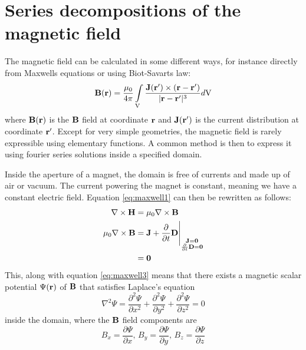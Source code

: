 \section{Series decompositions of the magnetic field}
\label{sec:series_decompositions}
The magnetic field can be calculated in some different ways, for instance
directly from Maxwells equations or using Biot-Savarts law:
\begin{equation}
    \vb{B}(\vb{r}) = \frac{\mu_0}{4\pi}\int\limits_{\mathrm{V}}
    \frac{\vb{J}(\vb{r'})\times (\vb{r} - \vb{r'})}
    {|\vb{r} - \vb{r'}|^3} d\mathrm{V}
    \label{eq:Biot_Savart}
\end{equation}
where $\vb{B}(\vb{r})$ is the $\vb{B}$ field at coordinate $\vb{r}$ and
$\vb{J}(\vb{r'})$ is the current distribution at coordinate $\vb{r'}$.
\cite[Ch.5.4]{russenschuck_field_2011}
Except for very simple geometries, the magnetic field is rarely
expressible using elementary functions. A common method is then
to express it using fourier series solutions inside a specified domain.
\cite[Ch.6]{russenschuck_field_2011}

Inside the aperture of a magnet, the domain is free of currents and made
up of air or vacuum. The current powering the magnet is constant,
meaning we have a constant electric field. Equation \ref{eq:maxwell1}
can then be rewritten as follows:
\begin{align}
    \begin{split}
        \nabla \times \vb{H} &= \mu_0\nabla \times \vb{B}\\
        \mu_0\nabla \times \vb{B}
        &=\vb{J} + \frac{\partial}{\partial t}\vb{D}
        \Bigg\vert_{\substack{\vb{J}=\vb{0} \\
                \frac{\partial}{\partial t}\vb{D}=\vb{0}}} \\
        &= \vb{0}
    \end{split}
\end{align}
This, along with equation \ref{eq:maxwell3} means that there
exists a magnetic scalar potential $\Psi(\vb{r})$ of $\vb{B}$ that satisfies
Laplace's equation
\begin{equation}
    \nabla^2\Psi = \frac{\partial^2 \Psi}{\partial x^2}
    + \frac{\partial^2 \Psi}{\partial y^2}
    + \frac{\partial^2 \Psi}{\partial z^2} = 0
    \label{eq:laplacian_zero}
\end{equation}
inside the domain, where the $\vb{B}$ field components are
\begin{equation}
    B_x = \frac{\partial \Psi}{\partial x}, \,
    B_y = \frac{\partial \Psi}{\partial y}, \,
    B_z = \frac{\partial \Psi}{\partial z}
\end{equation}
